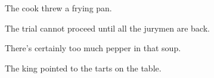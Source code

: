 \documentclass[addpoints]{exam}
\begin{document}
\begin{questions}
          \hrulefill

          \hrulefill

          \hrulefill

        \question[2] The cook threw a frying pan.

          \hrulefill

          \hrulefill
        \question[2] The trial cannot proceed until all the jurymen are back.

          \hrulefill

          \hrulefill
        \question[2] There's certainly too much pepper in that soup.

          \hrulefill

          \hrulefill
        \question[2] The king pointed to the tarts on the table.

          \hrulefill

          \hrulefill

  \end{questions}

  \vspace{1.25cm}

  \begin{center}
    \gradetable[v][pages]
  \end{center}
\end{document}
